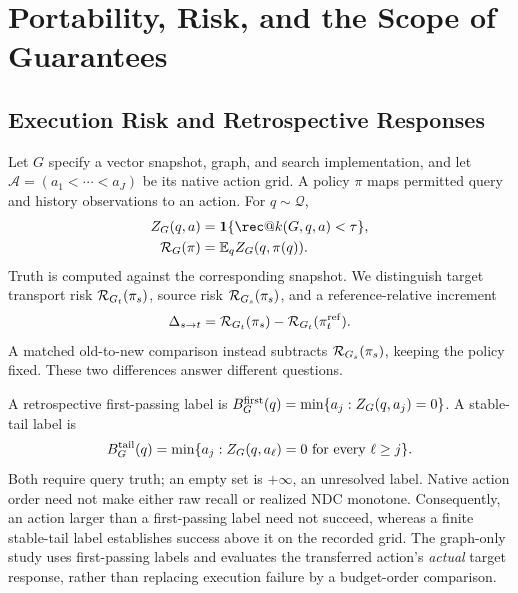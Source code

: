 \section{Portability, Risk, and the Scope of Guarantees}
\label{sec:theory}

\subsection{Execution Risk and Retrospective Responses}
Let $G$ specify a vector snapshot, graph, and search implementation, and let $\mathcal A=(a_1<\cdots<a_J)$ be its native action grid. A policy $\pi$ maps permitted query and history observations to an action. For $q\sim\mathcal Q$,
\begin{equation}
 \begin{aligned}
 Z_G(q,a)&=\indicator\{\rec@k(G,q,a)<\tau\},\\
 \risk_G(\pi)&=\mathbb E_q Z_G(q,\pi(q)).
 \end{aligned}\label{eq:risk}
\end{equation}
Truth is computed against the corresponding snapshot. We distinguish target transport risk $\mathcal{R}_{G_t}(\pi_s)$, source risk $\mathcal{R}_{G_s}(\pi_s)$, and a reference-relative increment
\begin{equation}
 \Delta_{s\to t}=\mathcal{R}_{G_t}(\pi_s)-\mathcal{R}_{G_t}(\pi_t^{\rm ref}).\label{eq:increment}
\end{equation}
A matched old-to-new comparison instead subtracts $\mathcal{R}_{G_s}(\pi_s)$, keeping the policy fixed. These two differences answer different questions.

A retrospective first-passing label is $B_G^{\rm first}(q)=\min\{a_j:Z_G(q,a_j)=0\}$. A stable-tail label is
\begin{equation}
 B_G^{\rm tail}(q)=\min\{a_j:Z_G(q,a_\ell)=0\text{ for every }\ell\ge j\}.\label{eq:stable-label}
\end{equation}
Both require query truth; an empty set is $+\infty$, an unresolved label. Native action order need not make either raw recall or realized NDC monotone. Consequently, an action larger than a first-passing label need not succeed, whereas a finite stable-tail label establishes success above it on the recorded grid. The graph-only study uses first-passing labels and evaluates the transferred action's \emph{actual} target response, rather than replacing execution failure by a budget-order comparison.

